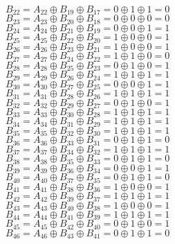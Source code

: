 $B_{22}=A_{22}\oplus B_{19}\oplus B_{17}=0\oplus 1\oplus 1=0$\\
$B_{23}=A_{23}\oplus B_{20}\oplus B_{18}=0\oplus 0\oplus 0=0$\\
$B_{24}=A_{24}\oplus B_{21}\oplus B_{19}=0\oplus 0\oplus 1=1$\\
$B_{25}=A_{25}\oplus B_{22}\oplus B_{20}=1\oplus 0\oplus 0=1$\\
$B_{26}=A_{26}\oplus B_{23}\oplus B_{21}=1\oplus 0\oplus 0=1$\\
$B_{27}=A_{27}\oplus B_{24}\oplus B_{22}=1\oplus 1\oplus 0=0$\\
$B_{28}=A_{28}\oplus B_{25}\oplus B_{23}=0\oplus 1\oplus 0=1$\\
$B_{29}=A_{29}\oplus B_{26}\oplus B_{24}=1\oplus 1\oplus 1=1$\\
$B_{30}=A_{30}\oplus B_{27}\oplus B_{25}=0\oplus 0\oplus 1=1$\\
$B_{31}=A_{31}\oplus B_{28}\oplus B_{26}=1\oplus 1\oplus 1=1$\\
$B_{32}=A_{32}\oplus B_{29}\oplus B_{27}=0\oplus 1\oplus 0=1$\\
$B_{33}=A_{33}\oplus B_{30}\oplus B_{28}=1\oplus 1\oplus 1=1$\\
$B_{34}=A_{34}\oplus B_{31}\oplus B_{29}=1\oplus 1\oplus 1=1$\\
$B_{35}=A_{35}\oplus B_{32}\oplus B_{30}=1\oplus 1\oplus 1=1$\\
$B_{36}=A_{36}\oplus B_{33}\oplus B_{31}=0\oplus 1\oplus 1=0$\\
$B_{37}=A_{37}\oplus B_{34}\oplus B_{32}=1\oplus 1\oplus 1=1$\\
$B_{38}=A_{38}\oplus B_{35}\oplus B_{33}=0\oplus 1\oplus 1=0$\\
$B_{39}=A_{39}\oplus B_{36}\oplus B_{34}=0\oplus 0\oplus 1=1$\\
$B_{40}=A_{40}\oplus B_{37}\oplus B_{35}=0\oplus 1\oplus 1=0$\\
$B_{41}=A_{41}\oplus B_{38}\oplus B_{36}=1\oplus 0\oplus 0=1$\\
$B_{42}=A_{42}\oplus B_{39}\oplus B_{37}=1\oplus 1\oplus 1=1$\\
$B_{43}=A_{43}\oplus B_{40}\oplus B_{38}=1\oplus 0\oplus 0=1$\\
$B_{44}=A_{44}\oplus B_{41}\oplus B_{39}=1\oplus 1\oplus 1=1$\\
$B_{45}=A_{45}\oplus B_{42}\oplus B_{40}=0\oplus 1\oplus 0=1$\\
$B_{46}=A_{46}\oplus B_{43}\oplus B_{41}=0\oplus 1\oplus 1=0$\\
